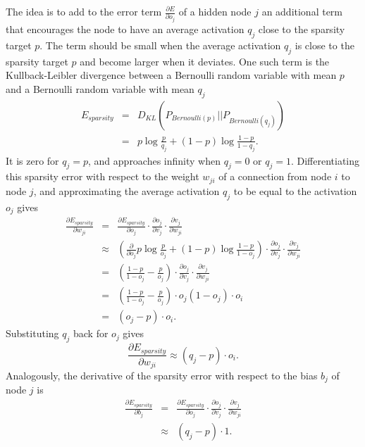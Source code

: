 The idea is to add to the error term $\frac{\partial E}{\partial o_{j}}$
of a hidden node $j$ an additional term that encourages the node
to have an average activation $q_{j}$ close to the sparsity target
$p$. The term should be small when the average activation $q_{j}$
is close to the sparsity target $p$ and become larger when it deviates.
One such term is the Kullback-Leibler divergence between a Bernoulli
random variable with mean $p$ and a Bernoulli random variable with
mean $q_{j}$
\begin{eqnarray*}
E_{sparsity} & = & D_{KL}(P_{Bernoulli(p)}||P_{Bernoulli(q_{j})})\\
 & = & p\log\frac{p}{q_{j}}+(1-p)\log\frac{1-p}{1-q_{j}}.
\end{eqnarray*}
It is zero for $q_{j}=p$, and approaches infinity when $q_{j}=0$
or $q_{j}=1$. Differentiating this sparsity error with respect to
the weight $w_{ji}$ of a connection from node $i$ to node $j$,
and approximating the average activation $q_{j}$ to be equal to the
activation $o_{j}$ gives
\begin{eqnarray*}
\frac{\partial E_{sparsity}}{\partial w_{ji}} & = & \frac{\partial E_{sparsity}}{\partial o_{j}}\cdot\frac{\partial o_{j}}{\partial v_{j}}\cdot\frac{\partial v_{j}}{\partial w_{ji}}\\
 & \approx & \left(\frac{\partial}{\partial o_{j}}p\log\frac{p}{o_{j}}+(1-p)\log\frac{1-p}{1-o_{j}}\right)\cdot\frac{\partial o_{j}}{\partial v_{j}}\cdot\frac{\partial v_{j}}{\partial w_{ji}}\\
 & = & \left(\frac{1-p}{1-o_{j}}-\frac{p}{o_{j}}\right)\cdot\frac{\partial o_{j}}{\partial v_{j}}\cdot\frac{\partial v_{j}}{\partial w_{ji}}\\
 & = & \left(\frac{1-p}{1-o_{j}}-\frac{p}{o_{j}}\right)\cdot o_{j}(1-o_{j})\cdot o_{i}\\
 & = & (o_{j}-p)\cdot o_{i}.
\end{eqnarray*}
Substituting $q_{j}$ back for $o_{j}$ gives
\[
\frac{\partial E_{sparsity}}{\partial w_{ji}}\approx(q_{j}-p)\cdot o_{i}.
\]
Analogously, the derivative of the sparsity error with respect to
the bias $b_{j}$ of node $j$ is 
\begin{eqnarray*}
\frac{\partial E_{sparsity}}{\partial b_{j}} & = & \frac{\partial E_{sparsity}}{\partial o_{j}}\cdot\frac{\partial o_{j}}{\partial v_{j}}\cdot\frac{\partial v_{j}}{\partial w_{ji}}\\
 & \approx & (q_{j}-p)\cdot1.
\end{eqnarray*}

